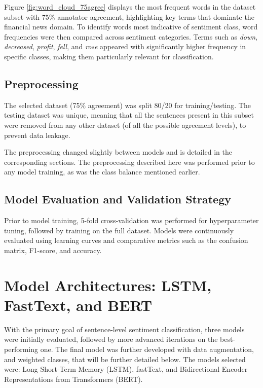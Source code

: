 \documentclass[conference]{IEEEtran}
\begin{document}
Figure \ref{fig:word_cloud_75agree} displays the most frequent words in the dataset subset with 75\% annotator agreement, highlighting key terms that dominate the financial news domain. To identify words most indicative of sentiment class, word frequencies were then compared across sentiment categories. Terms such as \textit{down}, \textit{decreased}, \textit{profit}, \textit{fell}, and \textit{rose} appeared with significantly higher frequency in specific classes, making them particularly relevant for classification.

\subsection{Preprocessing}

The selected dataset (75\% agreement) was split 80/20 for training/testing.
The testing dataset was unique, meaning that all the sentences present in this subset were removed from any other dataset (of all the possible agreement levels), to prevent data leakage.


The preprocessing changed slightly between models and is detailed in the corresponding sections. The preprocessing described here was performed prior to any model training, as was the class balance mentioned earlier.

\subsection{Model Evaluation and Validation Strategy}

Prior to model training, 5-fold cross-validation was performed for hyperparameter tuning, followed by training on the full dataset. Models were continuously evaluated using learning curves and comparative metrics such as the confusion matrix, F1-score, and accuracy.

\section{Model Architectures: LSTM, FastText, and BERT}

With the primary goal of sentence-level sentiment classification, three models were initially evaluated, followed by more advanced iterations on the best-performing one. The final model was further developed with data augmentation, and weighted classes, that will be further detailed below. The models selected were: Long Short-Term Memory (LSTM), fastText, and Bidirectional Encoder Representations from Transformers (BERT).
\end{document}
